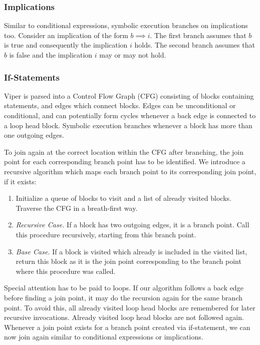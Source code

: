 \documentclass[11pt]{article}
\begin{document}
    \subsubsection{Implications}

    Similar to conditional expressions, symbolic execution branches on implications too. Consider
    an implication of the form $b \implies i$. The first branch assumes that $b$ is true and
    consequently the implication $i$ holds. The second branch assumes that $b$ is false and the
    implication $i$ may or may not hold. 

    \subsubsection{If-Statements} \label{if-statements}

    Viper is parsed into a Control Flow Graph (CFG) consisting of blocks containing
    statements, and edges which connect blocks. Edges can be unconditional or conditional,
    and can potentially form cycles whenever a back edge is connected to a loop head block.
    Symbolic execution branches whenever a block has more than one outgoing edges.

    To join again at the correct location within the CFG after branching,
    the join point for each corresponding branch point has to be identified.
    We introduce a recursive algorithm which maps each branch point to its corresponding join point,
    if it exists:

    \begin{enumerate}
        \item Initialize a queue of blocks to visit and a list of already visited blocks.
            Traverse the CFG in a breath-first way.
        \item \emph{Recursive Case.} If a block has two outgoing edges, it is a branch point.
            Call this procedure recursively, starting from this branch point.
        \item \emph{Base Case.} If a block is visited which already is included in the visited list,
            return this block as it is the join point corresponding to the branch point where this procedure was called.
    \end{enumerate}

    Special attention has to be paid to loops. If our algorithm follows a back edge before finding a join point,
    it may do the recursion again for the same branch point. To avoid this, all already visited loop head blocks
    are remembered for later recursive invocations. Already visited loop head blocks are not followed again.
    Whenever a join point exists for a branch point created via if-statement, we can now join again similar to
    conditional expressions or implications.
\end{document}
